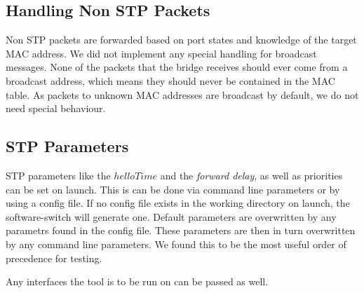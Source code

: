 \subsection{Handling Non STP Packets}
Non STP packets are forwarded based on port states and knowledge of the target MAC address.
We did not implement any special handling for broadcast messages.
None of the packets that the bridge receives should ever come from a broadcast address, which means they should never be contained in the MAC table.
As packets to unknown MAC addresses are broadcast by default, we do not need special behaviour.


\subsection{STP Parameters}
STP parameters like the $helloTime$ and the \textit{forward delay}, as well as priorities can be set on launch.
This is can be done via command line parameters or by using a config file.
If no config file exists in the working directory on launch, the software-switch will generate one.
Default parameters are overwritten by any parametrs found in the config file.
These parameters are then in turn overwritten by any command line parameters.
We found this to be the most useful order of precedence for testing.

Any interfaces the tool is to be run on can be passed as well.
